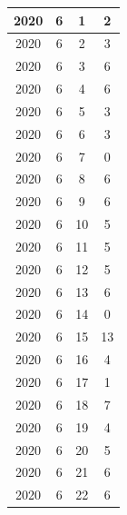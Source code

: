 \begin{longtable} {|c|c|c|c|}
\hline
2020         & 6            & 1            & 2                         \\ 
\hline
2020         & 6            & 2            & 3                         \\ 
\hline
2020         & 6            & 3            & 6                         \\ 
\hline
2020         & 6            & 4            & 6                         \\ 
\hline
2020         & 6            & 5            & 3                         \\ 
\hline
2020         & 6            & 6            & 3                         \\ 
\hline
2020         & 6            & 7            & 0                         \\ 
\hline
2020         & 6            & 8            & 6                         \\ 
\hline
2020         & 6            & 9            & 6                         \\ 
\hline
2020         & 6            & 10           & 5                         \\ 
\hline
2020         & 6            & 11           & 5                         \\ 
\hline
2020         & 6            & 12           & 5                         \\ 
\hline
2020         & 6            & 13           & 6                         \\ 
\hline
2020         & 6            & 14           & 0                         \\ 
\hline
2020         & 6            & 15           & 13                        \\ 
\hline
2020         & 6            & 16           & 4                         \\ 
\hline
2020         & 6            & 17           & 1                         \\ 
\hline
2020         & 6            & 18           & 7                         \\ 
\hline
2020         & 6            & 19           & 4                         \\ 
\hline
2020         & 6            & 20           & 5                         \\ 
\hline
2020         & 6            & 21           & 6                         \\ 
\hline
2020         & 6            & 22           & 6                         \\ 

\end{longtable}
